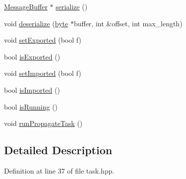 \begin{DoxyCompactItemize}
\item 
\hyperlink{struct_message_buffer}{MessageBuffer} $\ast$ \hyperlink{class_i_ductteip_task_ace530f277583106811b9955fa1977f9d}{serialize} ()
\item 
void \hyperlink{class_i_ductteip_task_a035d61635b69e2682c7361e3a07f610e}{deserialize} (\hyperlink{engine_8hpp_a0c8186d9b9b7880309c27230bbb5e69d}{byte} $\ast$buffer, int \&offset, int max\_\-length)
\item 
void \hyperlink{class_i_ductteip_task_a17aaf798213e43023a50f854fa236953}{setExported} (bool f)
\item 
bool \hyperlink{class_i_ductteip_task_af4805b045773376b86d6183048477eee}{isExported} ()
\item 
void \hyperlink{class_i_ductteip_task_a886387bf17236ca511f9e772fd33a961}{setImported} (bool f)
\item 
bool \hyperlink{class_i_ductteip_task_a5b644c2fc03f581eb1b1b077a4bae8e0}{isImported} ()
\item 
bool \hyperlink{class_i_ductteip_task_a91d7a4855bd1f2b82608c4da8f4dd778}{isRunning} ()
\item 
void \hyperlink{class_i_ductteip_task_ab388f79a34057d17d41286f57db4a288}{runPropagateTask} ()
\end{DoxyCompactItemize}


\subsection{Detailed Description}


Definition at line 37 of file task.hpp.

